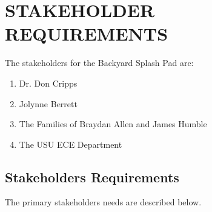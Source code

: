 \section{STAKEHOLDER REQUIREMENTS} %

The stakeholders for the Backyard Splash Pad are:

\begin{enumerate}
	\item Dr. Don Cripps
	\item Jolynne Berrett
	\item The Families of Braydan Allen and James Humble
	\item The USU ECE Department
\end{enumerate}

\subsection{Stakeholders Requirements}

The primary stakeholders needs are described below.


